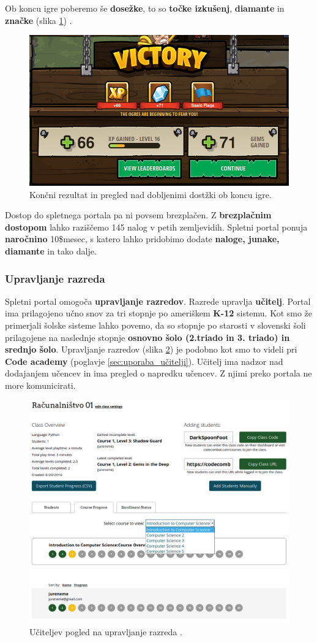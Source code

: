  Ob koncu igre poberemo še \textbf{dosežke}, to so \textbf{točke
   izkušenj}, \textbf{diamante} in \textbf{značke} (slika
 \ref{fig:web:cc:ingame:ach}) . 

\begin{figure}[h!]
  \centering
    \includegraphics [width=0.35\linewidth, keepaspectratio =
   1] {./images/sc_web/cc_ingame-ach-v02.jpg}
   \caption{Končni rezultat in pregled nad dobljenimi dostžki ob koncu
     igre\cite{web:codecombat}.}
   \label{fig:web:cc:ingame:ach}
 \end{figure}

 Dostop do spletnega portala pa ni povsem brezplačen. Z
 \textbf{brezplačnim dostopom} lahko raziščemo 145 nalog v petih
 zemljevidih. Spletni portal ponuja \textbf{naročnino} 10\$\/mesec, s
 katero lahko pridobimo dodate \textbf{naloge, junake, diamante} in
 tako dalje.
 
\subsubsection{Upravljanje razreda}
\label{sec:upravljanje_razreda_cc}

Spletni portal omogoča \textbf{upravljanje razredov}. Razrede upravlja
\textbf{učitelj}.  Portal ima prilagojeno učno snov za tri stopnje po
ameriškem \textbf{K-12} sistemu. Kot smo že primerjali šolske sisteme
lahko povemo, da so stopnje po starosti v slovenski šoli prilagojene
na naslednje stopnje \textbf{osnovno šolo (2.triado in 3. triado) in
  srednjo šolo}. Upravljanje razredov (slika \ref{fig:web:cc:teach})
je podobno kot smo to videli pri \textbf{Code academy} (poglavje
\ref{sec:uporaba_učitelji}). Učitelj ima nadzor nad dodajanjem učencev
in ima pregled o napredku učencev. Z njimi preko portala ne more
komunicirati.

\begin{figure}[ht!]
  \centering
    \includegraphics [width=0.75\linewidth, keepaspectratio =
   1] {./images/sc_web/cc_teach-clsv-v01.jpg}
   \caption{Učiteljev pogled na upravljanje razreda \cite{web:codecombat}.}
   \label{fig:web:cc:teach}
\end{figure}


